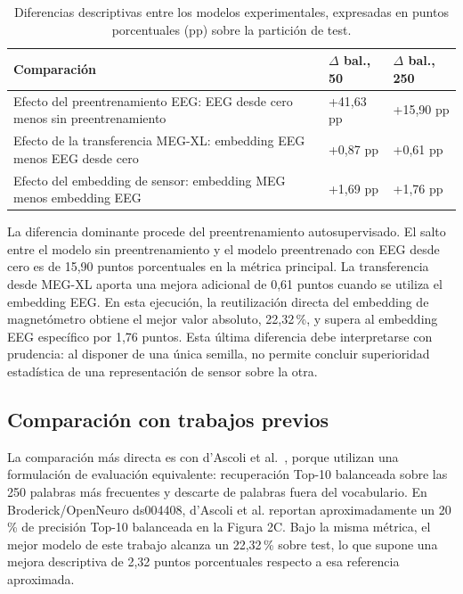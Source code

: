 \begin{table}[htbp]
\centering
\footnotesize
\setlength{\tabcolsep}{5pt}
\renewcommand{\arraystretch}{1.18}
\begin{tabularx}{\textwidth}{
    >{\raggedright\arraybackslash}X
    >{\centering\arraybackslash}p{2.4cm}
    >{\centering\arraybackslash}p{2.4cm}
}
\toprule
\textbf{Comparación} &
\textbf{\(\Delta\) bal., 50} &
\textbf{\(\Delta\) bal., 250} \\
\midrule
Efecto del preentrenamiento EEG:
EEG desde cero menos sin preentrenamiento &
+41,63 pp &
+15,90 pp \\

Efecto de la transferencia MEG-XL:
embedding EEG menos EEG desde cero &
+0,87 pp &
+0,61 pp \\

Efecto del embedding de sensor:
embedding MEG menos embedding EEG &
+1,69 pp &
+1,76 pp \\
\bottomrule
\end{tabularx}
\caption{Diferencias descriptivas entre los modelos experimentales, expresadas en puntos porcentuales (pp) sobre la partición de test.}
\label{tab:diferencias_condiciones}
\end{table}

La diferencia dominante procede del preentrenamiento autosupervisado. El salto entre el modelo sin preentrenamiento y el modelo preentrenado con EEG desde cero es de 15,90 puntos porcentuales en la métrica principal. La transferencia desde MEG-XL aporta una mejora adicional de 0,61 puntos cuando se utiliza el embedding EEG. En esta ejecución, la reutilización directa del embedding de magnetómetro obtiene el mejor valor absoluto, 22,32\,\%, y supera al embedding EEG específico por 1,76 puntos. Esta última diferencia debe interpretarse con prudencia: al disponer de una única semilla, no permite concluir superioridad estadística de una representación de sensor sobre la otra.

\subsection{Comparación con trabajos previos}

La comparación más directa es con d'Ascoli et al.~\cite{dascoli2025words}, porque utilizan una formulación de evaluación equivalente: recuperación Top-10 balanceada sobre las 250 palabras más frecuentes y descarte de palabras fuera del vocabulario. En Broderick/OpenNeuro ds004408, d'Ascoli et al. reportan aproximadamente un 20\,\% de precisión Top-10 balanceada en la Figura 2C. Bajo la misma métrica, el mejor modelo de este trabajo alcanza un 22,32\,\% sobre test, lo que supone una mejora descriptiva de 2,32 puntos porcentuales respecto a esa referencia aproximada.

